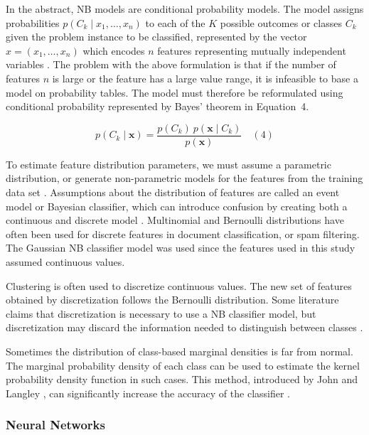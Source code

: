 \documentclass[sn-mathphys-num]{sn-jnl}%
\begin{document}
In the abstract, NB models are conditional probability models. The model assigns probabilities $p(C_{k}\mid x_{1},\ldots, x_{n})$ to each of the $K$ possible outcomes or classes $C_{k}$ given the problem instance to be classified, represented by the vector $x = (x_{1},\ldots, x_{n})$ which encodes $n$ features representing mutually independent variables \cite{Murty2011}. The problem with the above formulation is that if the number of features $n$ is large or the feature has a large value range, it is infeasible to base a model on probability tables. The model must therefore be reformulated using conditional probability represented by Bayes' theorem in Equation~4.

\begin{equation}
	p(C_{k}\mid \mathbf{x})={\frac{p(C_{k})\ p(\mathbf{x} \mid C_{k})}{p(\mathbf{x})}}
	\quad\left(4\right)
\end{equation}

To estimate feature distribution parameters, we must assume a parametric distribution, or generate non-parametric models for the features from the training data set \cite{John2013}. Assumptions about the distribution of features are called an event model or Bayesian classifier, which can introduce confusion by creating both a continuous and discrete model \cite{Mccallum2001, Metsis2006}. Multinomial and Bernoulli distributions have often been used for discrete features in document classification, or spam filtering. The Gaussian NB classifier model was used since the features used in this study assumed continuous values.

Clustering is often used to discretize continuous values. The new set of features obtained by discretization follows the Bernoulli distribution. Some literature claims that discretization is necessary to use a NB classifier model, but discretization may discard the information needed to distinguish between classes \cite{Hand2001}.

Sometimes the distribution of class-based marginal densities is far from normal. The marginal probability density of each class can be used to estimate the kernel probability density function in such cases. This method, introduced by John and Langley \cite{John2013}, can significantly increase the accuracy of the classifier \cite{Piryonesi2020, HastieRosset2009}.

\subsubsection{Neural Networks}
\end{document}
